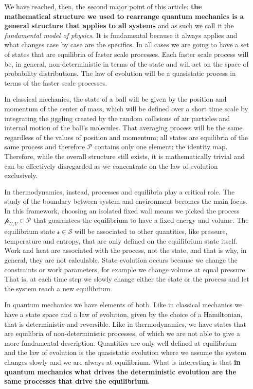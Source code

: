\documentclass[11pt]{article}
\begin{document}
We have reached, then, the second major point of this article: \textbf{the mathematical structure we used to rearrange quantum mechanics is a general structure that applies to all systems} and as such we call it the \emph{fundamental model of physics}. It is fundamental because it always applies and what changes case by case are the specifics. In all cases we are going to have a set of states that are equilibria of faster scale processes. Each faster scale process will be, in general, non-deterministic in terms of the state and will act on the space of probability distributions. The law of evolution will be a quasistatic process in terms of the faster scale processes.

In classical mechanics, the state of a ball will be given by the position and momentum of the center of mass, which will be defined over a short time scale by integrating the jiggling created by the random collisions of air particles and internal motion of the ball's molecules. That averaging process will be the same regardless of the values of position and momentum; all states are equilibria of the same process and therefore $\mathcal{P}$ contains only one element: the identity map. Therefore, while the overall structure still exists, it is mathematically trivial and can be effectively disregarded as we concentrate on the law of evolution exclusively.

In thermodynamics, instead, processes and equilibria play a critical role. The study of the boundary between system and environment becomes the main focus. In this framework, choosing an isolated fixed wall means we picked the process $\mathcal{p}_{U,V} \in \mathcal{P}$ that guarantees the equilibrium to have a fixed energy and volume. The equilibrium state $\mathcal{s} \in \mathcal{S}$ will be associated to other quantities, like pressure, temperature and entropy, that are only defined on the equilibrium state itself. Work and heat are associated with the process, not the state, and that is why, in general, they are not calculable. State evolution occurs because we change the constraints or work parameters, for example we change volume at equal pressure. That is, at each time step we slowly change either the state or the process and let the system reach a new equilibrium.

In quantum mechanics we have elements of both. Like in classical mechanics we have a state space and a law of evolution, given by the choice of a Hamiltonian, that is deterministic and reversible. Like in thermodynamics, we have states that are equilibria of non-deterministic processes, of which we are not able to give a more fundamental description. Quantities are only well defined at equilibrium and the law of evolution is the quasistatic evolution where we assume the system changes slowly and we are always at equilibrium. What is interesting is that \textbf{in quantum mechanics what drives the deterministic evolution are the same processes that drive the equilibrium}.
\end{document}
